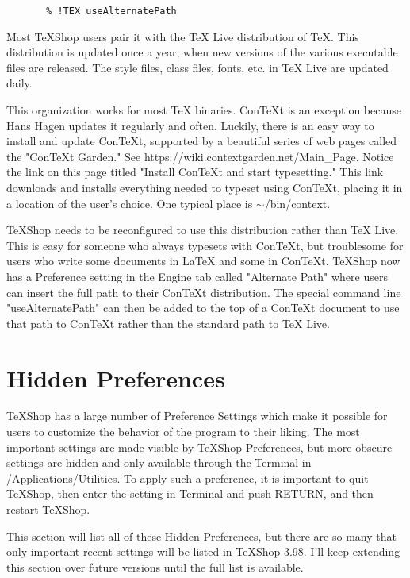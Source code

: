 \documentclass[11pt, oneside]{article}   	%
\begin{document}
\newpage

\begin{verbatim}
       % !TEX useAlternatePath
\end{verbatim}
 
 Most TeXShop users pair it with the TeX Live distribution of TeX. This distribution is updated once a year, when new versions of the various executable files are released. The style files, class files, fonts, etc. in TeX Live are updated daily.
 
 This organization works for most TeX binaries. ConTeXt is an exception because Hans Hagen updates it regularly and often. Luckily, there is an easy way to install and update ConTeXt, supported by a beautiful series of web pages called the "ConTeXt Garden." See https://wiki.contextgarden.net/Main\_Page. Notice the link on this page titled "Install ConTeXt and start typesetting." This link downloads and installs everything needed to typeset using ConTeXt, placing it in a location of the user's choice. One typical place is $\sim$/bin/context. 
 
TeXShop needs to be reconfigured to use this distribution rather than TeX Live. This is easy for someone who always typesets with ConTeXt, but troublesome for users who write some documents in LaTeX and some in ConTeXt. TeXShop now has a Preference setting in the Engine tab called "Alternate Path" where users can insert the full path to their ConTeXt distribution. The special command line "useAlternatePath" can then be added to the top of a ConTeXt document to use that path to ConTeXt rather than the standard path to TeX Live.
 
 
\section{Hidden Preferences}
TeXShop has a large number of Preference Settings which make it possible for users to customize the behavior of the program to their liking. The most important settings are made visible by TeXShop Preferences, but more obscure settings are hidden and only available through the Terminal in /Applications/Utilities. To apply such a preference, it is important to quit TeXShop, then enter the setting in Terminal and push RETURN, and then restart TeXShop. 

This section will list all of these Hidden Preferences, but there are so many that only important recent settings will be listed in TeXShop 3.98. I'll keep extending this section over future versions until the full list is available. 
\end{document}
